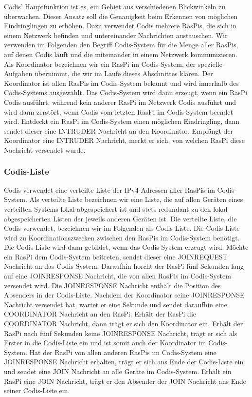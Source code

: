 \documentclass[journal]{IEEEtran}
\begin{document}
Codis' Hauptfunktion ist es, ein Gebiet aus verschiedenen Blickwinkeln zu überwachen. Dieser Ansatz soll die Genauigkeit beim Erkennen von möglichen Eindringlingen zu erhöhen. Dazu verwendet Codis mehrere RasPis, die sich in einem Netzwerk befinden und untereinander Nachrichten austauschen. Wir verwenden im Folgenden den Begriff Codis-System für die Menge aller RasPis, auf denen Codis läuft und die miteinander in einem Netzwerk kommunizieren. Als Koordinator bezeichnen wir ein RasPi im Codis-System, der spezielle Aufgaben übernimmt, die wir im Laufe dieses Abschnittes klären. Der Koordinator ist allen RasPis im Codis-System bekannt und wird innerhalb des Codis-Systems ausgewählt. Das Codis-System wird dann erzeugt, wenn ein RasPi Codis ausführt, während kein anderer RasPi im Netzwerk Codis ausführt und wird dann zerstört, wenn Codis vom letzten RasPi im Codis-System beendet wird. Entdeckt ein RasPi im Codis-System einen möglichen Eindringling, dann sendet dieser eine \MakeUppercase{intruder} Nachricht an den Koordinator. Empfängt der Koordinator eine \MakeUppercase{intruder} Nachricht, merkt er sich, von welchen RasPi diese Nachricht versendet wurde.

\subsubsection{Codis-Liste}

Codis verwendet eine verteilte Liste der IPv4-Adressen aller RasPis im Codis-System. Als verteilte Liste bezeichnen wir eine Liste, die auf allen Geräten eines verteilten Systems lokal abgespeichert ist und stets redundant zu den lokal abgespeicherten Listen der jeweils anderen Geräten ist. Die verteilte Liste, die Codis verwendet, bezeichnen wir im Folgenden als Codis-Liste. Die Codis-Liste wird zu Koordinationszwecken zwischen den RasPis im Codis-System benötigt.
Die Codis-Liste wird dann gebildet, wenn das Codis-System erzeugt wird. Möchte ein RasPi dem Codis-System beitreten, sendet dieser eine \MakeUppercase{joinrequest} Nachricht an das Codis-System. Daraufhin horcht der RasPi fünf Sekunden lang auf eine \MakeUppercase{joinresponse} Nachricht, die von allen RasPis im Codis-System versendet wird. Die \MakeUppercase{joinresponse} Nachricht enthält die Position des Absenders in der Codis-Liste. Nachdem der Koordinator seine \MakeUppercase{joinresponse} Nachricht versendet hat, wartet er eine Sekunde und sendet daraufhin eine \MakeUppercase{coordinator} Nachricht an den RasPi. Erhält der RasPi die \MakeUppercase{coordinator} Nachricht, dann trägt er sich den Koordinator ein. Erhält der RasPi nach fünf Sekunden keine \MakeUppercase{joinresponse} Nachricht, trägt er sich als Erster in die Codis-Liste ein und ist somit auch der Koordinator im Codis-System. Hat der RasPi von allen anderen RasPis im Codis-System eine \MakeUppercase{joinresponse} Nachricht erhalten, trägt er sich ans Ende der Codis-Liste ein und sendet eine \MakeUppercase{join} Nachricht an alle Geräte im Codis-System. Erhält ein RasPi eine \MakeUppercase{join} Nachricht, trägt er den Absender der \MakeUppercase{join} Nachricht ans Ende seiner Codis-Liste ein.
\end{document}
